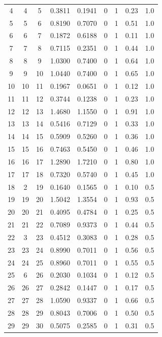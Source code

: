 \begin{longtable}{ccccccccc}
		4 & 4 & 5 & 0.3811 & 0.1941 & 0 & 1 & 0.23 & 1.0 \\
		5 & 5 & 6 & 0.8190 & 0.7070 & 0 & 1 & 0.51 & 1.0 \\
		6 & 6 & 7 & 0.1872 & 0.6188 & 0 & 1 & 0.11 & 1.0 \\
		7 & 7 & 8 & 0.7115 & 0.2351 & 0 & 1 & 0.44 & 1.0 \\
		8 & 8 & 9 & 1.0300 & 0.7400 & 0 & 1 & 0.64 & 1.0 \\
		9 & 9 & 10 & 1.0440 & 0.7400 & 0 & 1 & 0.65 & 1.0 \\
		10 & 10 & 11 & 0.1967 & 0.0651 & 0 & 1 & 0.12 & 1.0 \\
		11 & 11 & 12 & 0.3744 & 0.1238 & 0 & 1 & 0.23 & 1.0 \\
		12 & 12 & 13 & 1.4680 & 1.1550 & 0 & 1 & 0.91 & 1.0 \\
		13 & 13 & 14 & 0.5416 & 0.7129 & 0 & 1 & 0.33 & 1.0 \\
		14 & 14 & 15 & 0.5909 & 0.5260 & 0 & 1 & 0.36 & 1.0 \\
		15 & 15 & 16 & 0.7463 & 0.5450 & 0 & 1 & 0.46 & 1.0 \\
		16 & 16 & 17 & 1.2890 & 1.7210 & 0 & 1 & 0.80 & 1.0 \\
		17 & 17 & 18 & 0.7320 & 0.5740 & 0 & 1 & 0.45 & 1.0 \\
		18 & 2 & 19 & 0.1640 & 0.1565 & 0 & 1 & 0.10 & 0.5 \\
		19 & 19 & 20 & 1.5042 & 1.3554 & 0 & 1 & 0.93 & 0.5 \\
		20 & 20 & 21 & 0.4095 & 0.4784 & 0 & 1 & 0.25 & 0.5 \\
		21 & 21 & 22 & 0.7089 & 0.9373 & 0 & 1 & 0.44 & 0.5 \\
		22 & 3 & 23 & 0.4512 & 0.3083 & 0 & 1 & 0.28 & 0.5 \\
		23 & 23 & 24 & 0.8990 & 0.7011 & 0 & 1 & 0.56 & 0.5 \\
		24 & 24 & 25 & 0.8960 & 0.7011 & 0 & 1 & 0.55 & 0.5 \\
		25 & 6 & 26 & 0.2030 & 0.1034 & 0 & 1 & 0.12 & 0.5 \\
		26 & 26 & 27 & 0.2842 & 0.1447 & 0 & 1 & 0.17 & 0.5 \\
		27 & 27 & 28 & 1.0590 & 0.9337 & 0 & 1 & 0.66 & 0.5 \\
		28 & 28 & 29 & 0.8043 & 0.7006 & 0 & 1 & 0.50 & 0.5 \\
		29 & 29 & 30 & 0.5075 & 0.2585 & 0 & 1 & 0.31 & 0.5 \\

\end{longtable}
